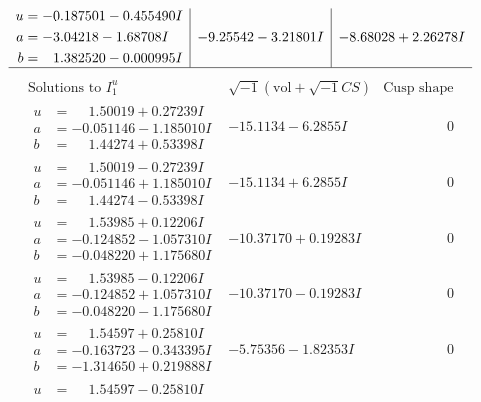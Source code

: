 \documentclass[1p]{elsarticle_modified}
\theoremstyle{definition}
\newcommand{\I}{\sqrt{-1}}
\begin{document}
$$\begin{array}{c|c|c}
\begin{aligned}
u &= -0.187501 - 0.455490 I \\
a &= -3.04218 - 1.68708 I \\
b &= \phantom{-}1.382520 - 0.000995 I\end{aligned}
 & -9.25542 - 3.21801 I & -8.68028 + 2.26278 I\\
 \hline 
 \end{array}$$\newpage$$\begin{array}{c|c|c}  
\text{Solutions to }I^u_{1}& \I (\text{vol} + \sqrt{-1}CS) & \text{Cusp shape}\\
 \hline 
\begin{aligned}
u &= \phantom{-}1.50019 + 0.27239 I \\
a &= -0.051146 - 1.185010 I \\
b &= \phantom{-}1.44274 + 0.53398 I\end{aligned}
 & -15.1134 - 6.2855 I & \phantom{-0.000000 } 0 \\ \hline\begin{aligned}
u &= \phantom{-}1.50019 - 0.27239 I \\
a &= -0.051146 + 1.185010 I \\
b &= \phantom{-}1.44274 - 0.53398 I\end{aligned}
 & -15.1134 + 6.2855 I & \phantom{-0.000000 } 0 \\ \hline\begin{aligned}
u &= \phantom{-}1.53985 + 0.12206 I \\
a &= -0.124852 - 1.057310 I \\
b &= -0.048220 + 1.175680 I\end{aligned}
 & -10.37170 + 0.19283 I & \phantom{-0.000000 } 0 \\ \hline\begin{aligned}
u &= \phantom{-}1.53985 - 0.12206 I \\
a &= -0.124852 + 1.057310 I \\
b &= -0.048220 - 1.175680 I\end{aligned}
 & -10.37170 - 0.19283 I & \phantom{-0.000000 } 0 \\ \hline\begin{aligned}
u &= \phantom{-}1.54597 + 0.25810 I \\
a &= -0.163723 - 0.343395 I \\
b &= -1.314650 + 0.219888 I\end{aligned}
 & -5.75356 - 1.82353 I & \phantom{-0.000000 } 0 \\ \hline\begin{aligned}
u &= \phantom{-}1.54597 - 0.25810 I \\

\end{aligned}
\end{array}$$
\end{document}
